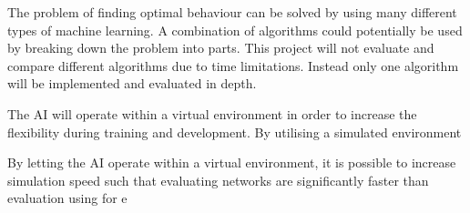 The problem of finding optimal behaviour can be solved by using many different types of machine learning. A combination of algorithms could potentially be used by breaking down the problem into parts. This project will not evaluate and compare different algorithms due to time limitations. Instead only one algorithm will be implemented and evaluated in depth.

The AI will operate within a virtual environment in order to increase the flexibility during training and development. By utilising a simulated environment 



By letting the AI operate within a virtual environment, it is possible to increase simulation speed such that evaluating networks are significantly faster than evaluation using for e




